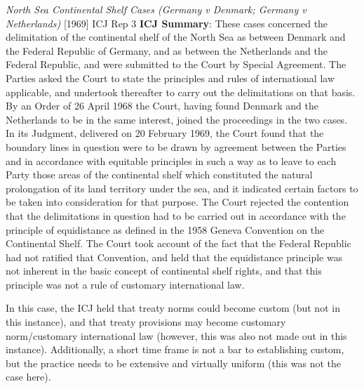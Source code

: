 \begin{casedetails}{\textit{North Sea Continental Shelf Cases (Germany v Denmark; Germany v Netherlands)} [1969] ICJ Rep 3}\label{case:North Sea Continental Shelf}
    \flushleft
    \textbf{ICJ Summary}: These cases concerned the delimitation of the continental shelf of the North Sea as between Denmark and the Federal Republic of Germany, and as between the Netherlands and the Federal Republic, and were submitted to the Court by Special Agreement. The Parties asked the Court to state the principles and rules of international law applicable, and undertook thereafter to carry out the delimitations on that basis. By an Order of 26 April 1968 the Court, having found Denmark and the Netherlands to be in the same interest, joined the proceedings in the two cases. In its Judgment, delivered on 20 February 1969, the Court found that the boundary lines in question were to be drawn by agreement between the Parties and in accordance with equitable principles in such a way as to leave to each Party those areas of the continental shelf which constituted the natural prolongation of its land territory under the sea, and it indicated certain factors to be taken into consideration for that purpose. The Court rejected the contention that the delimitations in question had to be carried out in accordance with the principle of equidistance as defined in the 1958 Geneva Convention on the Continental Shelf. The Court took account of the fact that the Federal Republic had not ratified that Convention, and held that the equidistance principle was not inherent in the basic concept of continental shelf rights, and that this principle was not a rule of customary international law.

    \tcblower

    \flushleft

    In this case, the ICJ held that treaty norms could become custom (but not in this instance), and that treaty provisions may become customary norm/customary international law (however, this was also not made out in this instance). Additionally, a short time frame is not a bar to establishing custom, but the practice needs to be extensive and virtually uniform (this was not the case here).
\end{casedetails}

